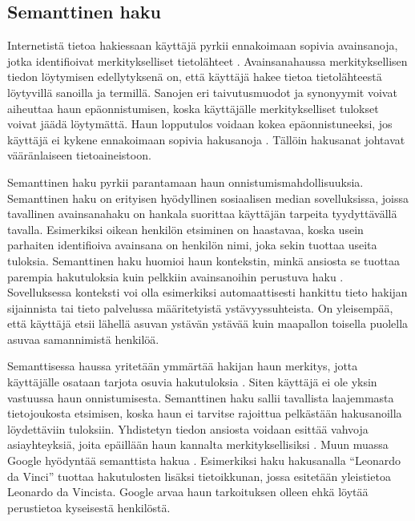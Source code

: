 \documentclass[finnish, 12pt, a4paper, elec, utf8, pdfa, online]{aaltothesis}
\begin{document}
{\subsection{Semanttinen haku}

Internetistä tietoa hakiessaan käyttäjä pyrkii ennakoimaan sopivia avainsanoja, jotka identifioivat merkitykselliset tietolähteet \cite{keyword_search}. Avainsanahaussa merkityksellisen tiedon löytymisen edellytyksenä on, että käyttäjä hakee tietoa tietolähteestä löytyvillä sanoilla ja termillä. Sanojen eri taivutusmuodot ja synonyymit voivat aiheuttaa haun epäonnistumisen, koska käyttäjälle merkitykselliset tulokset voivat jäädä löytymättä. Haun lopputulos voidaan kokea epäonnistuneeksi, jos käyttäjä ei kykene ennakoimaan sopivia hakusanoja \cite{keyword_search}. Tällöin hakusanat johtavat vääränlaiseen tietoaineistoon.

Semanttinen haku pyrkii parantamaan haun onnistumismahdollisuuksia. Semanttinen haku on erityisen hyödyllinen sosiaalisen median sovelluksissa, joissa tavallinen avainsanahaku on hankala suorittaa käyttäjän tarpeita tyydyttävällä tavalla. Esimerkiksi oikean henkilön etsiminen on haastavaa, koska usein parhaiten identifioiva avainsana on henkilön nimi, joka sekin tuottaa useita tuloksia. Semanttinen haku huomioi haun kontekstin, minkä ansiosta se tuottaa parempia hakutuloksia kuin pelkkiin avainsanoihin perustuva haku \cite{profium_search}. Sovelluksessa konteksti voi olla esimerkiksi automaattisesti hankittu tieto hakijan sijainnista tai tieto palvelussa määritetyistä ystävyyssuhteista. On yleisempää, että käyttäjä etsii lähellä asuvan ystävän ystävää kuin maapallon toisella puolella asuvaa samannimistä henkilöä.

Semanttisessa haussa yritetään ymmärtää hakijan haun merkitys, jotta käyttäjälle osataan tarjota osuvia hakutuloksia \cite{profium_search}. Siten käyttäjä ei ole yksin vastuussa haun onnistumisesta. Semanttinen haku sallii tavallista laajemmasta tietojoukosta etsimisen, koska haun ei tarvitse rajoittua pelkästään hakusanoilla löydettäviin tuloksiin. Yhdistetyn tiedon ansiosta voidaan esittää vahvoja asiayhteyksiä, joita epäillään haun kannalta merkityksellisiksi \cite{semantic_search}. Muun muassa Google hyödyntää semanttista hakua \cite{knowledge_graph} \cite{linked_data_finlad}. Esimerkiksi haku hakusanalla ``Leonardo da Vinci'' tuottaa hakutulosten lisäksi tietoikkunan, jossa esitetään yleistietoa Leonardo da Vincista. Google arvaa haun tarkoituksen olleen ehkä löytää perustietoa kyseisestä henkilöstä.

}
\end{document}

